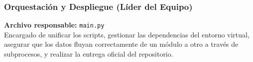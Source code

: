 \documentclass[12pt,a4paper]{article}
\begin{document}
\subsubsection{Orquestación y Despliegue (Líder del Equipo)}
\textbf{Archivo responsable:} \texttt{main.py}\\
Encargado de unificar los scripts, gestionar las dependencias del entorno virtual, asegurar que los datos fluyan correctamente de un módulo a otro a través de subprocesos, y realizar la entrega oficial del repositorio.
\end{document}
